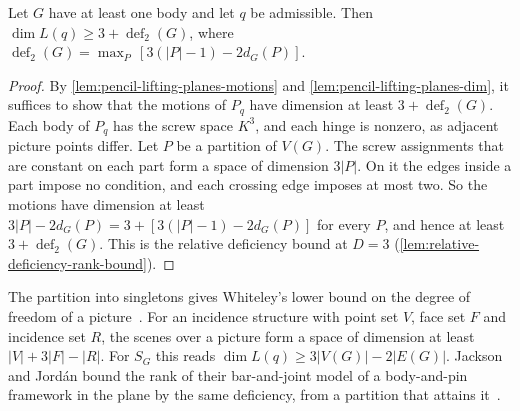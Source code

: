 \begin{lemma}
  \label{lem:pencil-lifting-space-deficiency}
  \leanok
  Let $G$ have at least one body and let $q$ be admissible. Then
  $\dim L(q) \ge 3 + \operatorname{def}_2(G)$, where
  $\operatorname{def}_2(G) = \max_P\,[3(|P| - 1) - 2d_G(P)]$.
\end{lemma}
\begin{proof}
  \leanok
  By \cref{lem:pencil-lifting-planes-motions} and
  \cref{lem:pencil-lifting-planes-dim}, it suffices to show that the
  motions of $P_q$ have dimension at least
  $3 + \operatorname{def}_2(G)$. Each body of $P_q$ has the screw space
  $K^3$, and each hinge is nonzero, as adjacent picture points differ.
  Let $P$ be a partition of $V(G)$. The screw assignments that are
  constant on each part form a space of dimension $3|P|$. On it the edges
  inside a part impose no condition, and each crossing edge imposes at
  most two. So the motions have dimension at least
  $3|P| - 2d_G(P) = 3 + [3(|P| - 1) - 2d_G(P)]$ for every $P$, and hence at
  least $3 + \operatorname{def}_2(G)$. This is the relative deficiency
  bound at $D = 3$ (\cref{lem:relative-deficiency-rank-bound}).
\end{proof}

The partition into singletons gives Whiteley's lower bound on the
degree of freedom of a picture~\cite[p.~273]{whiteley1984}. For an
incidence structure with point set $V$, face set $F$ and incidence set
$R$, the scenes over a picture form a space of dimension at least
$|V| + 3|F| - |R|$. For $S_G$ this reads $\dim L(q) \ge 3|V(G)| - 2|E(G)|$.
Jackson and Jord\'an bound the rank of their bar-and-joint model of a
body-and-pin framework in the plane by the same deficiency, from a
partition that attains it~\cite[Lemma~4.1]{jacksonJordan2006pin}.


